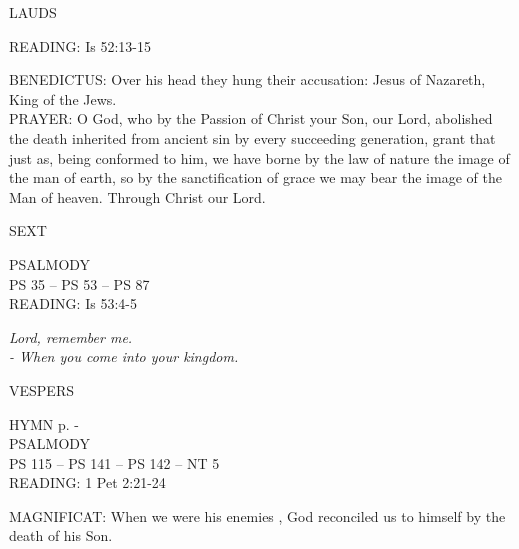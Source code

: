 \begin{flushleft}\normalsize{\uppercase{LAUDS\\}}\end{flushleft}
\noindent\small{\uppercase{READING:}}    Is 52:13-15 \textbf{   \\}

\noindent\small{\uppercase{BENEDICTUS:}}	Over his head they hung their accusation: Jesus of Nazareth, King of the Jews.\\

\noindent\small{\uppercase{PRAYER:}}	O God, who by the Passion of Christ your Son, our Lord, abolished the death inherited from ancient sin by every succeeding generation, grant that just as, being conformed to him, we have borne by the law of nature the image of the man of earth, so by the sanctification of grace we may bear the image of the Man of heaven. Through Christ our Lord.

\begin{flushleft}\normalsize{\uppercase{SEXT\\}}\end{flushleft}
\noindent\small{\uppercase{PSALMODY}\\}
\uppercase{Ps 35 -- Ps 53 -- Ps 87}\vspace{0.5em}\\

\noindent\small{\uppercase{READING:}}    Is 53:4-5 \textbf{   \\}
\begin{center}
\small\textit{Lord, remember me.\\
- When you come into your kingdom.}\end{center}

\begin{flushleft}\normalsize{\uppercase{VESPERS\\}}\end{flushleft}
\small{\uppercase{HYMN} p. \pageref{lent:firstHymn}-\pageref{lent:lastHymn}\\}
\noindent\small{\uppercase{PSALMODY}\\}
\uppercase{Ps 115 -- Ps 141 -- Ps 142 -- NT 5}\vspace{0.5em}\\

\noindent\small{\uppercase{READING:}}    1 Pet 2:21-24 \textbf{   \\}

\noindent\small{\uppercase{MAGNIFICAT:}}	When we were his enemies , God reconciled us to himself by the death of his Son.\\

